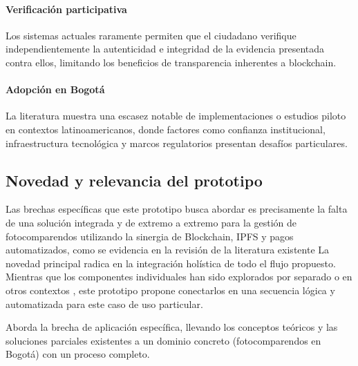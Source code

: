 \paragraph{Verificación participativa}
Los sistemas actuales raramente permiten que el ciudadano verifique independientemente la autenticidad e integridad de la evidencia presentada contra ellos, limitando los beneficios de transparencia inherentes a blockchain. 

\paragraph{Adopción en Bogotá}
 La literatura muestra una escasez notable de implementaciones o estudios piloto en contextos latinoamericanos, donde factores como confianza institucional, infraestructura tecnológica y marcos regulatorios presentan desafíos particulares. \parencite{choquevilca2024blockchain, rezabala2025blockchain}

\subsection{Novedad y relevancia del prototipo} 
Las brechas específicas que este prototipo busca abordar es precisamente la falta de una solución integrada y de extremo a extremo para la gestión de fotocomparendos utilizando la sinergia de Blockchain, IPFS y pagos automatizados, como se evidencia en la revisión de la literatura existente \parencite{yousfi2022its,AnandSingh_ProjectReport_Year}
La novedad principal radica en la integración holística de todo el flujo propuesto. Mientras que los componentes individuales han sido explorados por separado \parencite{adel2023decentralized,mishra2024integration} o en otros contextos \parencite{mani2023smart,dutta2023solution}, este prototipo propone conectarlos en una secuencia lógica y automatizada para este caso de uso particular. 

Aborda la brecha de aplicación específica, llevando los conceptos teóricos \parencite{swan2015blockchain, antonopoulos2023mastering} y las soluciones parciales existentes \parencite{choquevilca2024blockchain} a un dominio concreto (fotocomparendos en Bogotá) con un proceso completo. 

